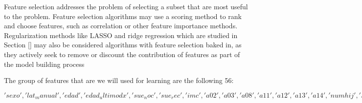 \documentclass[11pt]{article}
\begin{document}
Feature selection addresses the problem of selecting a subset that are most useful to the problem. Feature selection algorithms may use a scoring method to rank and choose features, such as correlation or other feature importance methods. Regularization methods like LASSO and ridge regression which are studied in Section \ref{} may also be considered algorithms with feature selection baked in, as they actively seek to remove or discount the contribution of features as part of the model building process

The group of features that are we will used for learning are the following 56: 

\begin{center}
\textit{$'sexo', 'lat_manual', 'edad', 'edad_ultimodx', 'sue_noc', 'sue_rec', 'imc', 'a02', 'a03', 'a08', 'a11', 'a12', 'a13', 'a14', 'numhij', 'sdvive', 'sdeconom', 'sdresid', 'sdestciv', 'sdatrb', 'hta', 'glu', 'lipid', 'tabac_cant', 'cor', 'arri', 'card', 'ictus', 'tce', 'tce_con', 'dietaketo', 'dietaglucemica', 'dietasaludable', 'renta', 'nivel_educativo', 'educrenta', 'physical_exercise', 'familiar_ad', 'scd_visita1', 'preocupacion_visita1', 'act_aten_visita1', 'act_orie_visita1', 'act_mrec_visita1', 'act_visu_visita1', 'act_expr_visita1', 'act_comp_visita1', 'act_apat_visita1', 'gds_visita1', 'stai_visita1', 'eq5dsalud_visita1', 'eq5deva_visita1', 'relafami_visita1', 'relaamigo_visita1', 'valcvida_visita1', 'valsatvid_visita1', 'valfelc_visita1'$}
\end{center}
\end{document}
